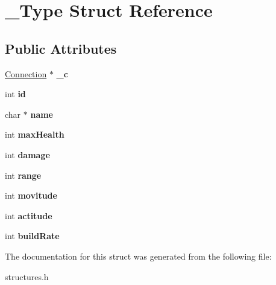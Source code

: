 \hypertarget{struct__Type}{
\section{\_\-Type Struct Reference}
\label{struct__Type}
}
\subsection*{Public Attributes}
\begin{DoxyCompactItemize}
\item 
\hypertarget{struct__Type_ad29ab19a8e24b3e061def63387a35f3a}{
\hyperlink{structConnection}{Connection} $\ast$ {\bfseries \_\-c}}
\label{struct__Type_ad29ab19a8e24b3e061def63387a35f3a}

\item 
\hypertarget{struct__Type_abb29d6bc12d5e5292288d2bbb912fe0c}{
int {\bfseries id}}
\label{struct__Type_abb29d6bc12d5e5292288d2bbb912fe0c}

\item 
\hypertarget{struct__Type_a8bfe041d7c6b8f4e604b0ed9b77dbe15}{
char $\ast$ {\bfseries name}}
\label{struct__Type_a8bfe041d7c6b8f4e604b0ed9b77dbe15}

\item 
\hypertarget{struct__Type_aadc5e535d7cb319edd535537ea5ccd25}{
int {\bfseries maxHealth}}
\label{struct__Type_aadc5e535d7cb319edd535537ea5ccd25}

\item 
\hypertarget{struct__Type_af2c6fd6aa27f9560294ebe5b3d0df6c3}{
int {\bfseries damage}}
\label{struct__Type_af2c6fd6aa27f9560294ebe5b3d0df6c3}

\item 
\hypertarget{struct__Type_a8b6fc93e65e9fdcb2d83d5c663628c6a}{
int {\bfseries range}}
\label{struct__Type_a8b6fc93e65e9fdcb2d83d5c663628c6a}

\item 
\hypertarget{struct__Type_a5fc8aa3dfeeb1f560f7412d237c019e2}{
int {\bfseries movitude}}
\label{struct__Type_a5fc8aa3dfeeb1f560f7412d237c019e2}

\item 
\hypertarget{struct__Type_a14fddf095892eb47dfdb84d5b138b19e}{
int {\bfseries actitude}}
\label{struct__Type_a14fddf095892eb47dfdb84d5b138b19e}

\item 
\hypertarget{struct__Type_a1877ea68a9fb2562e0260a11f3916ed5}{
int {\bfseries buildRate}}
\label{struct__Type_a1877ea68a9fb2562e0260a11f3916ed5}

\end{DoxyCompactItemize}


The documentation for this struct was generated from the following file:\begin{DoxyCompactItemize}
\item 
structures.h\end{DoxyCompactItemize}
